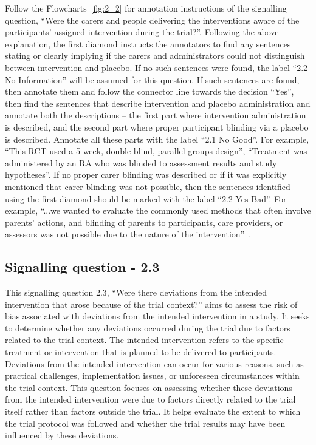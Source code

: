 \documentclass[sn-mathphys,Numbered]{sn-jnl}%
\begin{document}
Follow the Flowcharts~\ref{fig:2_2} for annotation instructions of the signalling question, ``Were the carers and people delivering the interventions aware of the participants' assigned intervention during the trial?''.
Following the above explanation, the first diamond instructs the annotators to find any sentences stating or clearly implying if the carers and administrators could not distinguish between intervention and placebo.
If no such sentences were found, the label ``2.2 No Information'' will be assumed for this question.
If such sentences are found, then annotate them and follow the connector line towards the decision ``Yes'', then find the sentences that describe intervention and placebo administration and annotate both the descriptions – the first part where intervention administration is described, and the second part where proper participant blinding via a placebo is described.
Annotate all these parts with the label ``2.1 No Good''.
For example, ``This RCT used a 5-week, double-blind, parallel groups design'', ``Treatment was administered by an RA who was blinded to assessment results and study hypotheses''\cite{chiaravalloti2020efficacy}.
If no proper carer blinding was described or if it was explicitly mentioned that carer blinding was not possible, then the sentences identified using the first diamond should be marked with the label ``2.2 Yes Bad''.
For example, ``...we wanted to evaluate the commonly used methods that often involve parents’ actions, and blinding of parents to participants, care providers, or assessors was not possible due to the nature of the intervention''~\cite{andersson2020effect}.



%
%
%
\subsection*{Signalling question - 2.3}
\label{subsec:2_3}
%
This signalling question 2.3, ``Were there deviations from the intended intervention that arose because of the trial context?'' aims to assess the risk of bias associated with deviations from the intended intervention in a study.
It seeks to determine whether any deviations occurred during the trial due to factors related to the trial context.
The intended intervention refers to the specific treatment or intervention that is planned to be delivered to participants.
Deviations from the intended intervention can occur for various reasons, such as practical challenges, implementation issues, or unforeseen circumstances within the trial context.
This question focuses on assessing whether these deviations from the intended intervention were due to factors directly related to the trial itself rather than factors outside the trial.
It helps evaluate the extent to which the trial protocol was followed and whether the trial results may have been influenced by these deviations.
\end{document}
